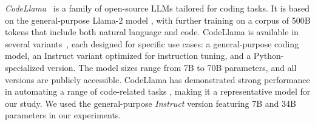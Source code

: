 

\textit{CodeLlama}~\cite{codellama} is a family of open-source LLMs tailored for coding tasks. It is based on the general-purpose Llama-2 model \cite{llama2}, with further training on a corpus of 500B tokens that include both natural language and code. CodeLlama is available in several variants~\cite{codellamaHF}, each designed for specific use cases: a general-purpose coding model, an Instruct variant optimized for instruction tuning, and a Python-specialized version. The model sizes range from 7B to 70B parameters, and all versions are publicly accessible. CodeLlama has demonstrated strong performance in automating a range of code-related tasks \cite{zan2024codes,xia2023universal}, making it a representative model for our study. We used the general-purpose \emph{Instruct} version featuring 7B and 34B parameters in our experiments.




